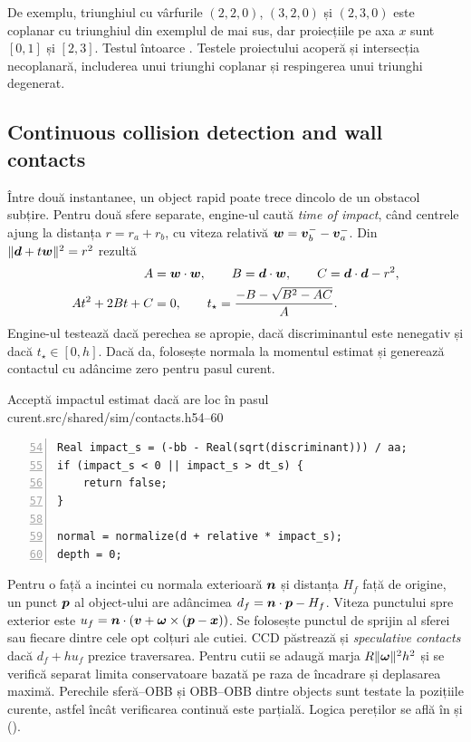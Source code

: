 \documentclass[11pt,a4paper]{article}
\begin{document}
De exemplu, triunghiul cu vârfurile \((2,2,0)\), \((3,2,0)\)
și \((2,3,0)\) este coplanar cu triunghiul din exemplul de mai sus,
dar proiecțiile pe axa \(x\) sunt \([0,1]\) și \([2,3]\).
Testul întoarce . Testele proiectului acoperă și
intersecția necoplanară, includerea unui triunghi coplanar și
respingerea unui triunghi degenerat.

\subsection{Continuous collision detection and wall contacts}

Între două instantanee, un object rapid poate trece dincolo de un
obstacol subțire. Pentru două sfere separate, engine-ul caută
\emph{time of impact}, când centrele ajung la distanța \(r=r_a+r_b\),
cu viteza relativă \(\boldsymbol{w}=\boldsymbol{v}_b^--\boldsymbol{v}_a^-\).
Din \(\|\boldsymbol{d}+t\boldsymbol{w}\|^2=r^2\) rezultă
\begin{align}
 A&=\boldsymbol{w}\cdot\boldsymbol{w},\qquad B=\boldsymbol{d}\cdot\boldsymbol{w},\qquad
 C=\boldsymbol{d}\cdot\boldsymbol{d}-r^2,\\
 At^2+2Bt+C&=0,\qquad t_\star=\frac{-B-\sqrt{B^2-AC}}{A}.
\end{align}
Engine-ul testează dacă perechea se apropie, dacă discriminantul
este nenegativ și dacă \(t_\star\in[0,h]\). Dacă da, folosește
normala la momentul estimat și generează contactul cu adâncime
zero pentru pasul curent.
\begin{codefragment}{Acceptă impactul estimat dacă are loc în pasul curent.}{src/shared/sim/contacts.h}{54--60}
\begin{lstlisting}[numbers=left,firstnumber=54]
Real impact_s = (-bb - Real(sqrt(discriminant))) / aa;
if (impact_s < 0 || impact_s > dt_s) {
    return false;
}

normal = normalize(d + relative * impact_s);
depth = 0;
\end{lstlisting}
\end{codefragment}

Pentru o față a incintei cu normala exterioară \(\boldsymbol{n}\)
și distanța \(H_f\) față de origine, un punct \(\boldsymbol{p}\) al
object-ului are adâncimea \(d_f=\boldsymbol{n}\cdot\boldsymbol{p}-H_f\).
Viteza punctului spre exterior este
\(u_f=\boldsymbol{n}\cdot(\boldsymbol{v}+\boldsymbol{\omega}\times(\boldsymbol{p}-\boldsymbol{x}))\).
Se folosește punctul de sprijin al sferei sau fiecare dintre
cele opt colțuri ale cutiei. CCD păstrează și \emph{speculative contacts} dacă \(d_f+hu_f\) prezice traversarea. Pentru
cutii se adaugă marja \(R\|\boldsymbol{\omega}\|^2h^2\) și se verifică
separat limita conservatoare bazată pe raza de încadrare și
deplasarea maximă. Perechile sferă--OBB și OBB--OBB dintre
objects sunt testate la pozițiile curente, astfel încât
verificarea continuă este parțială. Logica pereților se află
în  și 
().
\end{document}
